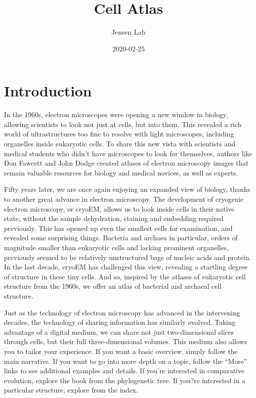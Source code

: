 \documentclass[]{tufte-book}
\title{Cell Atlas}
\author{Jensen Lab}
\date{2020-02-25}
\begin{document}
\maketitle



{
\setcounter{tocdepth}{1}
\tableofcontents
}

\chapter*{Introduction}\label{introduction}

In the 1960s, electron microscopes were opening a new window in biology,
allowing scientists to look not just at cells, but into them. This
revealed a rich world of ultrastructures too fine to resolve with light
microscopes, including organelles inside eukaryotic cells. To share this
new vista with scientists and medical students who didn't have
microscopes to look for themselves, authors like Don Fawcett and John
Dodge created atlases of electron microscopy images that remain valuable
resources for biology and medical novices, as well as experts.

Fifty years later, we are once again enjoying an expanded view of
biology, thanks to another great advance in electron microscopy. The
development of cryogenic electron microscopy, or cryoEM, allows us to
look inside cells in their native state, without the sample dehydration,
staining and embedding required previously. This has opened up even the
smallest cells for examination, and revealed some surprising things.
Bacteria and archaea in particular, orders of magnitude smaller than
eukaryotic cells and lacking prominent organelles, previously seemed to
be relatively unstructured bags of nucleic acids and protein. In the
last decade, cryoEM has challenged this view, revealing a startling
degree of structure in these tiny cells. And so, inspired by the atlases
of eukaryotic cell structure from the 1960s, we offer an atlas of
bacterial and archaeal cell structure.

Just as the technology of electron microscopy has advanced in the
intervening decades, the technology of sharing information has similarly
evolved. Taking advantage of a digital medium, we can share not just
two-dimensional slices through cells, but their full three-dimensional
volumes. This medium also allows you to tailor your experience. If you
want a basic overview, simply follow the main narrative. If you want to
go into more depth on a topic, follow the ``More'' links to see
additional examples and details. If you're interested in comparative
evolution, explore the book from the phylogenetic tree. If you?re
interested in a particular structure, explore from the index.
\end{document}
